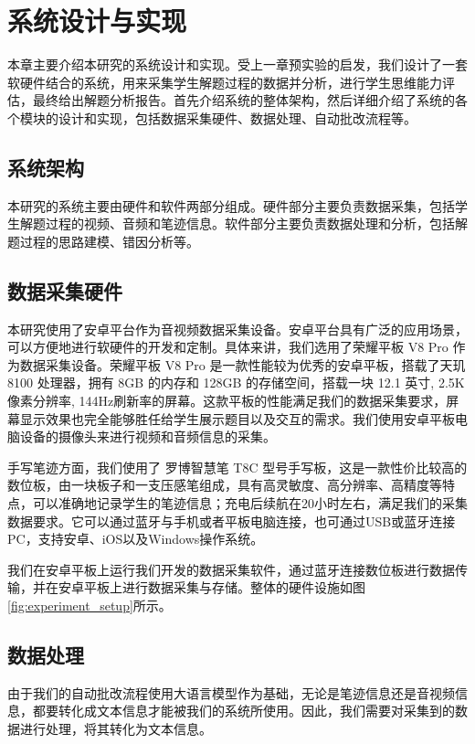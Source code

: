 
\chapter{系统设计与实现}

本章主要介绍本研究的系统设计和实现。受上一章预实验的启发，我们设计了一套软硬件结合的系统，用来采集学生解题过程的数据并分析，进行学生思维能力评估，最终给出解题分析报告。首先介绍系统的整体架构，然后详细介绍了系统的各个模块的设计和实现，包括数据采集硬件、数据处理、自动批改流程等。

\section{系统架构}

本研究的系统主要由硬件和软件两部分组成。硬件部分主要负责数据采集，包括学生解题过程的视频、音频和笔迹信息。软件部分主要负责数据处理和分析，包括解题过程的思路建模、错因分析等。

\section{数据采集硬件}

本研究使用了安卓平台作为音视频数据采集设备。安卓平台具有广泛的应用场景，可以方便地进行软硬件的开发和定制。具体来讲，我们选用了荣耀平板 V8 Pro 作为数据采集设备。荣耀平板 V8 Pro 是一款性能较为优秀的安卓平板，搭载了天玑 8100 处理器，拥有 8GB 的内存和 128GB 的存储空间，搭载一块 12.1 英寸, 2.5K 像素分辨率, 144Hz刷新率的屏幕。这款平板的性能满足我们的数据采集要求，屏幕显示效果也完全能够胜任给学生展示题目以及交互的需求。我们使用安卓平板电脑设备的摄像头来进行视频和音频信息的采集。

手写笔迹方面，我们使用了 罗博智慧笔 T8C 型号手写板，这是一款性价比较高的数位板，由一块板子和一支压感笔组成，具有高灵敏度、高分辨率、高精度等特点，可以准确地记录学生的笔迹信息；充电后续航在20小时左右，满足我们的采集数据要求。它可以通过蓝牙与手机或者平板电脑连接，也可通过USB或蓝牙连接PC，支持安卓、iOS以及Windows操作系统。

我们在安卓平板上运行我们开发的数据采集软件，通过蓝牙连接数位板进行数据传输，并在安卓平板上进行数据采集与存储。整体的硬件设施如图\ref{fig:experiment_setup}所示。

\section{数据处理}

由于我们的自动批改流程使用大语言模型作为基础，无论是笔迹信息还是音视频信息，都要转化成文本信息才能被我们的系统所使用。因此，我们需要对采集到的数据进行处理，将其转化为文本信息。